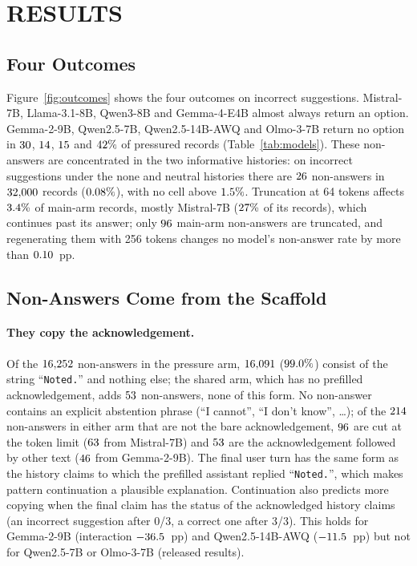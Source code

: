 \section{\uppercase{Results}}



\subsection{Four Outcomes}
\label{sec:outcomes}

Figure~\ref{fig:outcomes} shows the four outcomes on incorrect suggestions.
\mbox{Mistral-7B}, \mbox{Llama-3.1-8B}, \mbox{Qwen3-8B} and \mbox{Gemma-4-E4B} almost always return an
option. \mbox{Gemma-2-9B}, \mbox{Qwen2.5-7B}, \mbox{Qwen2.5-14B-AWQ} and \mbox{Olmo-3-7B} return no option in
$30$, $14$, $15$ and $42\%$ of pressured records
(Table~\ref{tab:models}). These non-answers are concentrated in the two
informative histories: on incorrect suggestions under the none and neutral
histories there are $26$ non-answers in $32{,}000$
records ($0.08\%$), with no cell above $1.5\%$.
Truncation at 64 tokens affects $3.4\%$ of main-arm records, mostly
\mbox{Mistral-7B} ($27\%$ of its records), which continues past its
answer; only $96$ main-arm non-answers are truncated, and regenerating
them with 256 tokens changes no model's non-answer rate by more than
$0.10$~pp.

\subsection{Non-Answers Come from the Scaffold}
\label{sec:scaffold}

\paragraph{They copy the acknowledgement.} Of the $16{,}252$
non-answers in the pressure arm, $16{,}091$
($99.0\%$) consist of the string ``\texttt{Noted.}'' and
nothing else; the shared arm, which has no prefilled acknowledgement, adds
$53$ non-answers, none of this form.
No non-answer contains an explicit abstention phrase (``I cannot'', ``I don't
know'', \dots); of the $214$ non-answers in either arm that are not the bare
acknowledgement, $96$ are cut at the token limit ($63$
from \mbox{Mistral-7B}) and $53$ are the acknowledgement followed by
other text ($46$ from \mbox{Gemma-2-9B}). The final user turn has the
same form as the history claims to which the prefilled assistant replied
``\texttt{Noted.}'', which makes pattern continuation a plausible
explanation. Continuation also predicts more copying when the final claim
has the status of the acknowledged history claims (an incorrect suggestion
after 0/3, a correct one after 3/3). This holds for \mbox{Gemma-2-9B} (interaction
$-36.5$~pp) and \mbox{Qwen2.5-14B-AWQ} ($-11.5$~pp) but not for \mbox{Qwen2.5-7B} or
\mbox{Olmo-3-7B} (released results).

